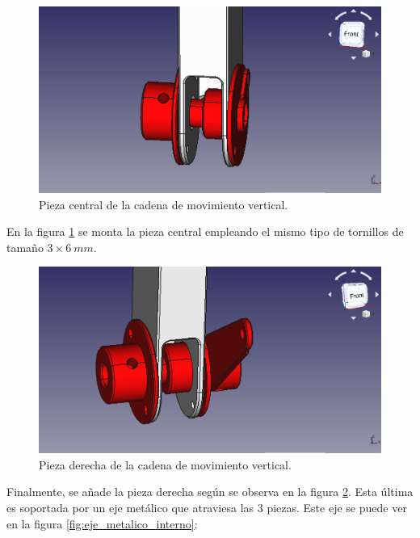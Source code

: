 \begin{figure}[H]
    \centering 
    \includegraphics[width=1\linewidth]{pictures/SoporteMotorCentral.png}
    \caption{Pieza central de la cadena de movimiento vertical.}
    \label{fig:pieza_central_brazo}
\end{figure}

En la figura \ref{fig:pieza_central_brazo} se monta la pieza central empleando el mismo tipo de tornillos de tamaño $3 \times 6~mm$.

\begin{figure}[H]
    \centering 
    \includegraphics[width=1\linewidth]{pictures/SoporteMotorDerecho.png}
    \caption{Pieza derecha de la cadena de movimiento vertical.}
    \label{fig:pieza_derecha_brazo}
\end{figure}

Finalmente, se añade la pieza derecha según se observa en la figura \ref{fig:pieza_derecha_brazo}. Esta última es soportada por un eje metálico que atraviesa las 3 piezas. Este eje se puede ver en la figura \ref{fig:eje_metalico_interno}:

